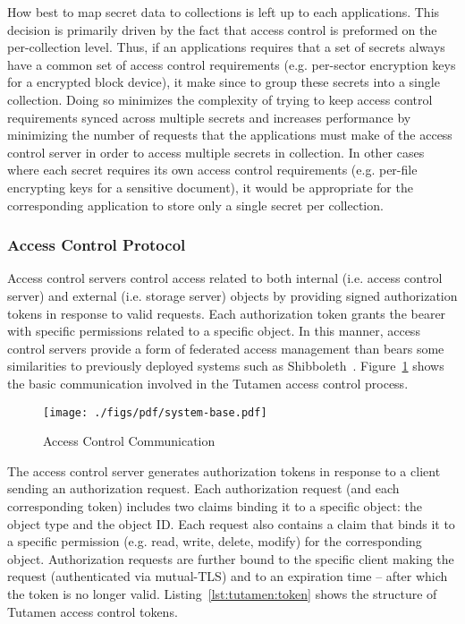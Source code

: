 How best to map secret data to collections is left up to each
applications. This decision is primarily driven by the fact that
access control is preformed on the per-collection level. Thus, if an
applications requires that a set of secrets always have a common set
of access control requirements (e.g. per-sector encryption keys for a
encrypted block device), it make since to group these secrets into a
single collection. Doing so minimizes the complexity of trying to keep
access control requirements synced across multiple secrets and
increases performance by minimizing the number of requests that the
applications must make of the access control server in order to access
multiple secrets in collection. In other cases where each secret
requires its own access control requirements (e.g. per-file encrypting
keys for a sensitive document), it would be appropriate for the
corresponding application to store only a single secret per
collection.

\subsubsection{Access Control Protocol}

Access control servers control access related to both internal
(i.e. access control server) and external (i.e. storage server)
objects by providing signed authorization tokens in response to valid
requests. Each authorization token grants the bearer with specific
permissions related to a specific object. In this manner, access
control servers provide a form of federated access management than
bears some similarities to previously deployed systems such as
Shibboleth~\cite{leandro2012}. Figure~\ref{fig:tutamen:systembase}
shows the basic communication involved in the Tutamen access control
process.

\begin{figure}[th]
  \centering
  \texttt{[image: ./figs/pdf/system-base.pdf]}
  \caption{Access Control Communication}
  \label{fig:tutamen:systembase}
\end{figure}

The access control server generates authorization tokens in response
to a client sending an authorization request. Each authorization
request (and each corresponding token) includes two claims binding it
to a specific object: the object type and the object ID. Each request
also contains a claim that binds it to a specific permission
(e.g. read, write, delete, modify) for the corresponding
object. Authorization requests are further bound to the specific
client making the request (authenticated via mutual-TLS) and to an
expiration time -- after which the token is no longer
valid. Listing~\ref{lst:tutamen:token} shows the structure of Tutamen
access control tokens.

